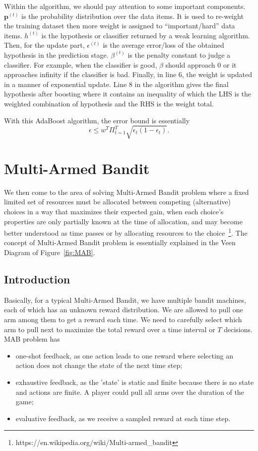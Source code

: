 \documentclass[11pt]{article}
\begin{document}
Within the algorithm, we should pay attention to some important components. $\mathbf{p}^{(t)}$ is the probability distribution over the data items. It is used to re-weight the training dataset then more weight is assigned to ``important/hard'' data items. $h^{(t)}$ is the hypothesis or classifier returned by a weak learning algorithm. Then, for the update part, $\epsilon^{(t)}$ is the average error/loss of the obtained hypothesis in the prediction stage. $\beta^{(t)}$ is the penalty constant to judge a classifier. For example, when the classifier is good, $\beta$ should approach 0 or it approaches infinity if the classifier is bad. Finally, in line 6, the weight is updated in a manner of exponential update. Line 8 in the algorithm gives the final hypothesis after boosting where it contains an inequality of which the LHS is the weighted combination of hypothesis and the RHS is the weight total. 

With this AdaBoost algorithm, the error bound is essentially 
\begin{equation}
    \epsilon \leq w^T \Pi_{t=1}^T \sqrt{\epsilon_t (1-\epsilon_t)}.
\end{equation}

\section{Multi-Armed Bandit}
We then come to the area of solving Multi-Armed Bandit problem where a fixed limited set of resources must be allocated between competing (alternative) choices in a way that maximizes their expected gain, when each choice's properties are only partially known at the time of allocation, and may become better understood as time passes or by allocating resources to the choice~\footnote{https://en.wikipedia.org/wiki/Multi-armed\_bandit}. The concept of Multi-Armed Bandit problem is essentially explained in the Veen Diagram of Figure~\ref{fig:MAB}.

\subsection{Introduction}
Basically, for a typical Multi-Armed Bandit, we have multiple bandit machines, each of which has an unknown reward distribution. We are allowed to pull one arm among them to get a reward each time. We need to carefully select which arm to pull next to maximize the total reward over a time interval or $T$ decisions. MAB problem has

\begin{itemize}
    \item one-shot feedback, as one action leads to one reward where selecting an action does not change the state of the next time step;
    \item exhaustive feedback, as the 'state' is static and finite because there is no state and actions are finite. A player could pull all arms over the duration of the game;
    \item evaluative feedback, as we receive a sampled reward at each time step.
\end{itemize}
\end{document}
